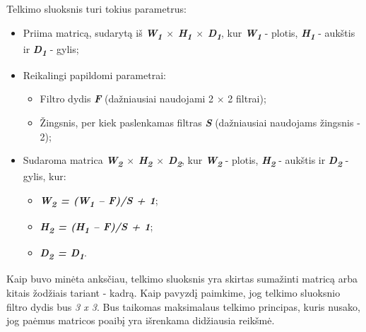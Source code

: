 \documentclass{VUMIFInfKursinis}
\begin{document}
Telkimo sluoksnis turi tokius parametrus:
\begin{itemize}
	\item Priima matricą, sudarytą iš \textit{\textbf{W\textsubscript{1} $\times$ H\textsubscript{1} $\times$ D\textsubscript{1}}}, kur \textit{\textbf{W\textsubscript{1}}} - plotis, \textit{\textbf{H\textsubscript{1}}} - aukštis ir \textit{\textbf{D\textsubscript{1}}} - gylis;
	\item Reikalingi papildomi parametrai:
	\begin{itemize}
		\item Filtro dydis \textbf{\textit{F}} (dažniausiai naudojami 2 $\times$ 2 filtrai);
		\item Žingsnis, per kiek paslenkamas filtras \textbf{\textit{S}} (dažniausiai naudojams žingsnis - 2);
	\end{itemize}
	\item Sudaroma matrica \textit{\textbf{W\textsubscript{2} $\times$ H\textsubscript{2} $\times$ D\textsubscript{2}}}, kur \textit{\textbf{W\textsubscript{2}}} - plotis, \textit{\textbf{H\textsubscript{2}}} - aukštis ir \textit{\textbf{D\textsubscript{2}}} - gylis, kur:
	\begin{itemize}
		\item \textit{\textbf{W\textsubscript{2} = (W\textsubscript{1} – F)/S + 1}};
		\item \textit{\textbf{H\textsubscript{2} = (H\textsubscript{1} – F)/S + 1}};
		\item \textit{\textbf{D\textsubscript{2} = D\textsubscript{1}}}.
	\end{itemize}
\end{itemize}


Kaip buvo minėta anksčiau, telkimo sluoksnis yra skirtas sumažinti matricą arba kitais žodžiais tariant - kadrą. Kaip pavyzdį paimkime, jog telkimo sluoksnio filtro dydis bus \textit{3 x 3}. Bus taikomas maksimalaus telkimo principas, kuris nusako, jog paėmus matricos poaibį yra išrenkama didžiausia reikšmė.
\end{document}
